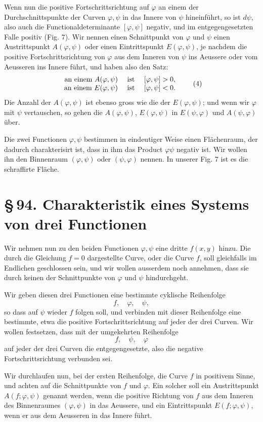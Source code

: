 \documentclass[11pt]{article}
\providecommand{\sect}[2]{\section*{\S\,#1. #2}}
\begin{document}
Wenn nun die positive Fortschrittsrichtung auf $\varphi$ an einem der Durchschnittspunkte der Curven $\varphi,\psi$ in das Innere von $\psi$ hineinführt, so ist $d\psi$, also auch die Functionaldeterminante $[\varphi,\psi]$ negativ, und im entgegengesetzten Falle positiv (Fig. 7). Wir nennen einen Schnittpunkt von $\varphi$ und $\psi$ einen Austrittspunkt $A(\varphi,\psi)$ oder einen Eintrittspunkt $E(\varphi,\psi)$, je nachdem die positive Fortschrittsrichtung von $\varphi$ aus dem Inneren von $\psi$ ins Aeussere oder vom Aeusseren ins Innere führt, und haben also den Satz:
\begin{equation}
\begin{array}{rcl}
\hbox{an einem }A(\varphi,\psi)&\hbox{ ist }&[\varphi,\psi]>0,\\
\hbox{an einem }E(\varphi,\psi)&\hbox{ ist }&[\varphi,\psi]<0.
\end{array}
\tag{4}
\end{equation}
Die Anzahl der $A(\varphi,\psi)$ ist ebenso gross wie die der $E(\varphi,\psi)$; und wenn wir $\varphi$ mit $\psi$ vertauschen, so gehen die $A(\varphi,\psi)$, $E(\varphi,\psi)$ in $E(\psi,\varphi)$ und $A(\psi,\varphi)$ über.

Die zwei Functionen $\varphi,\psi$ bestimmen in eindeutiger Weise einen Flächenraum, der dadurch charakterisirt ist, dass in ihm das Product $\varphi\psi$ negativ ist. Wir wollen ihn den Binnenraum $(\varphi,\psi)$ oder $(\psi,\varphi)$ nennen. In unserer Fig. 7 ist es die schraffirte Fläche.

\sect{94}{Charakteristik eines Systems von drei Functionen}

Wir nehmen nun zu den beiden Functionen $\varphi,\psi$ eine dritte $f(x,y)$ hinzu. Die durch die Gleichung $f=0$ dargestellte Curve, oder die Curve $f$, soll gleichfalls im Endlichen geschlossen sein, und wir wollen ausserdem noch annehmen, dass sie durch keinen der Schnittpunkte von $\varphi$ und $\psi$ hindurchgeht.

Wir geben diesen drei Functionen eine bestimmte cyklische Reihenfolge
\[
        f,\quad \varphi,\quad \psi,
\]
so dass auf $\psi$ wieder $f$ folgen soll, und verbinden mit dieser Reihenfolge eine bestimmte, etwa die positive Fortschrittsrichtung auf jeder der drei Curven. Wir wollen festsetzen, dass mit der umgekehrten Reihenfolge
\[
        f,\quad \psi,\quad \varphi
\]
auf jeder der drei Curven die entgegengesetzte, also die negative Fortschrittsrichtung verbunden sei.

Wir durchlaufen nun, bei der ersten Reihenfolge, die Curve $f$ in positivem Sinne, und achten auf die Schnittpunkte von $f$ und $\varphi$. Ein solcher soll ein Austrittspunkt $A(f;\varphi,\psi)$ genannt werden, wenn die positive Richtung von $f$ aus dem Inneren des Binnenraumes $(\varphi,\psi)$ in das Aeussere, und ein Eintrittspunkt $E(f;\varphi,\psi)$, wenn er aus dem Aeusseren in das Innere führt.
\end{document}
